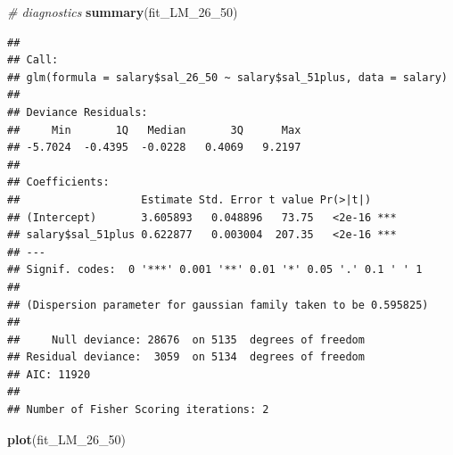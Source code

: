 \documentclass[]{article}
\newenvironment{Shaded}{\begin{snugshade}}{\end{snugshade}}
\newcommand{\KeywordTok}[1]{\textcolor[rgb]{0.13,0.29,0.53}{\textbf{#1}}}
\newcommand{\DecValTok}[1]{\textcolor[rgb]{0.00,0.00,0.81}{#1}}
\newcommand{\CommentTok}[1]{\textcolor[rgb]{0.56,0.35,0.01}{\textit{#1}}}
\newcommand{\NormalTok}[1]{#1}
\begin{document}
\begin{Shaded}
\begin{Highlighting}[]
\CommentTok{# diagnostics}
\KeywordTok{summary}\NormalTok{(fit_LM_26_}\DecValTok{50}\NormalTok{)}
\end{Highlighting}
\end{Shaded}

\begin{verbatim}
## 
## Call:
## glm(formula = salary$sal_26_50 ~ salary$sal_51plus, data = salary)
## 
## Deviance Residuals: 
##     Min       1Q   Median       3Q      Max  
## -5.7024  -0.4395  -0.0228   0.4069   9.2197  
## 
## Coefficients:
##                   Estimate Std. Error t value Pr(>|t|)    
## (Intercept)       3.605893   0.048896   73.75   <2e-16 ***
## salary$sal_51plus 0.622877   0.003004  207.35   <2e-16 ***
## ---
## Signif. codes:  0 '***' 0.001 '**' 0.01 '*' 0.05 '.' 0.1 ' ' 1
## 
## (Dispersion parameter for gaussian family taken to be 0.595825)
## 
##     Null deviance: 28676  on 5135  degrees of freedom
## Residual deviance:  3059  on 5134  degrees of freedom
## AIC: 11920
## 
## Number of Fisher Scoring iterations: 2
\end{verbatim}

\begin{Shaded}
\begin{Highlighting}[]
\KeywordTok{plot}\NormalTok{(fit_LM_26_}\DecValTok{50}\NormalTok{)}
\end{Highlighting}
\end{Shaded}
\end{document}

